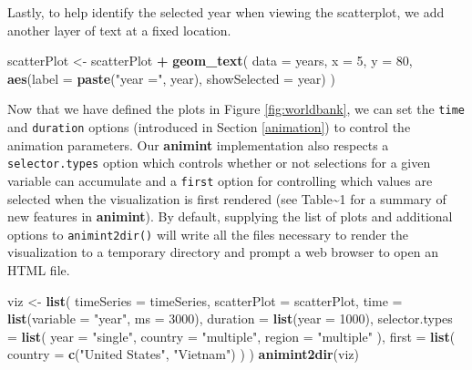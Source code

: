 \documentclass[12pt,]{article}
\newenvironment{Shaded}{\begin{snugshade}}{\end{snugshade}}
\newcommand{\DataTypeTok}[1]{\textcolor[rgb]{0.13,0.29,0.53}{#1}}
\newcommand{\DecValTok}[1]{\textcolor[rgb]{0.00,0.00,0.81}{#1}}
\newcommand{\KeywordTok}[1]{\textcolor[rgb]{0.13,0.29,0.53}{\textbf{#1}}}
\newcommand{\NormalTok}[1]{#1}
\newcommand{\OperatorTok}[1]{\textcolor[rgb]{0.81,0.36,0.00}{\textbf{#1}}}
\newcommand{\StringTok}[1]{\textcolor[rgb]{0.31,0.60,0.02}{#1}}
\theoremstyle{definition}
\theoremstyle{definition}
\theoremstyle{definition}
\theoremstyle{remark}
\begin{document}
Lastly, to help identify the selected year when viewing the scatterplot,
we add another layer of text at a fixed location.

\begin{Shaded}
\begin{Highlighting}[]
\NormalTok{scatterPlot <-}\StringTok{ }\NormalTok{scatterPlot }\OperatorTok{+}\StringTok{ }\KeywordTok{geom_text}\NormalTok{(}
  \DataTypeTok{data =}\NormalTok{ years, }\DataTypeTok{x =} \DecValTok{5}\NormalTok{, }\DataTypeTok{y =} \DecValTok{80}\NormalTok{,}
  \KeywordTok{aes}\NormalTok{(}\DataTypeTok{label =} \KeywordTok{paste}\NormalTok{(}\StringTok{"year ="}\NormalTok{, year),}
      \DataTypeTok{showSelected =}\NormalTok{ year)}
\NormalTok{)}
\end{Highlighting}
\end{Shaded}

Now that we have defined the plots in Figure \ref{fig:worldbank}, we can
set the \texttt{time} and \texttt{duration} options (introduced in
Section \ref{animation}) to control the animation parameters. Our
\textbf{animint} implementation also respects a \texttt{selector.types}
option which controls whether or not selections for a given variable can
accumulate and a \texttt{first} option for controlling which values are
selected when the visualization is first rendered (see
Table\textasciitilde{}1 for a summary of new features in
\textbf{animint}). By default, supplying the list of plots and
additional options to \texttt{animint2dir()} will write all the files
necessary to render the visualization to a temporary directory and
prompt a web browser to open an HTML file.

\begin{Shaded}
\begin{Highlighting}[]
\NormalTok{viz <-}\StringTok{ }\KeywordTok{list}\NormalTok{(}
  \DataTypeTok{timeSeries =}\NormalTok{ timeSeries,}
  \DataTypeTok{scatterPlot =}\NormalTok{ scatterPlot,}
  \DataTypeTok{time =} \KeywordTok{list}\NormalTok{(}\DataTypeTok{variable =} \StringTok{"year"}\NormalTok{, }\DataTypeTok{ms =} \DecValTok{3000}\NormalTok{),}
  \DataTypeTok{duration =} \KeywordTok{list}\NormalTok{(}\DataTypeTok{year =} \DecValTok{1000}\NormalTok{),}
  \DataTypeTok{selector.types =} \KeywordTok{list}\NormalTok{(}
    \DataTypeTok{year =} \StringTok{"single"}\NormalTok{,}
    \DataTypeTok{country =} \StringTok{"multiple"}\NormalTok{,}
    \DataTypeTok{region =} \StringTok{"multiple"}
\NormalTok{  ),}
  \DataTypeTok{first =} \KeywordTok{list}\NormalTok{(}
    \DataTypeTok{country =} \KeywordTok{c}\NormalTok{(}\StringTok{"United States"}\NormalTok{, }\StringTok{"Vietnam"}\NormalTok{)}
\NormalTok{  )}
\NormalTok{)}
\KeywordTok{animint2dir}\NormalTok{(viz)}
\end{Highlighting}
\end{Shaded}
\end{document}
